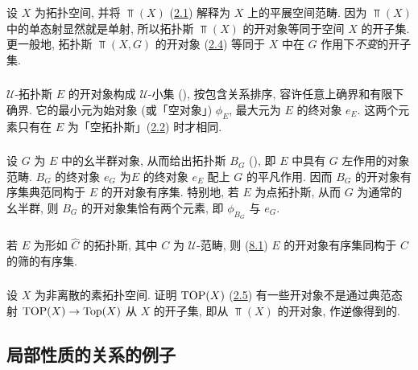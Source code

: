 \subsubsection{}
设 $X$ 为拓扑空间, 并将 $\Top(X)$ (\hyperref[IV.subsec2.1]{2.1}) 解释为 $X$ 上的平展空间范畴. 因为 $\Top(X)$ 中的单态射显然就是单射, 所以拓扑斯 $\Top(X)$ 的开对象等同于空间 $X$ 的开子集. 更一般地, 拓扑斯 $\Top(X,G)$ 的开对象 (\hyperref[IV.subsec2.4]{2.4}) 等同于 $X$ 中在 $G$ 作用下\emph{不变}的开子集.

\subsubsection{}
$𝒰$-拓扑斯 $E$ 的开对象构成 $𝒰$-小集 (), 按包含关系排序, 容许任意上确界和有限下确界. 它的最小元为始对象 (或「空对象」) $\phi_E$, 最大元为 $E$ 的终对象 $e_E$. 这两个元素只有在 $E$ 为「空拓扑斯」(\hyperref[IV.subsec2.2]{2.2}) 时才相同.

\subsubsection{}
设 $G$ 为 $E$ 中的幺半群对象, 从而给出拓扑斯 $B_G$ (), 即 $E$ 中具有 $G$ 左作用的对象范畴. $B_G$ 的终对象 $e_G$ 为\pageoriginale $E$ 的终对象 $e_E$ 配上 $G$ 的平凡作用. 因而 $B_G$ 的开对象有序集典范同构于 $E$ 的开对象有序集. 特别地, 若 $E$ 为点拓扑斯, 从而 $G$ 为通常的幺半群, 则 $B_G$ 的开对象集恰有两个元素, 即 $\phi_{B_G}$ 与 $e_G$.

\subsubsection{}
若 $E$ 为形如 $\widehat{C}$ 的拓扑斯, 其中 $C$ 为 $𝒰$-范畴, 则 (\hyperref[IV.subsec8.1]{8.1}) $E$ 的开对象有序集同构于 $C$ 的筛的有序集.

\subsubsection{}
设 $X$ 为非离散的素拓扑空间. 证明 $\operatorname{TOP}(X)$ (\hyperref[IV.subsec2.5]{2.5}) 有一些开对象不是通过典范态射  $\operatorname{TOP}(X)\rightarrow\operatorname{Top}(X)$ 从 $X$ 的开子集, 即从 $\Top(X)$ 的开对象, 作逆像得到的.

\subsection{局部性质的关系的例子}

